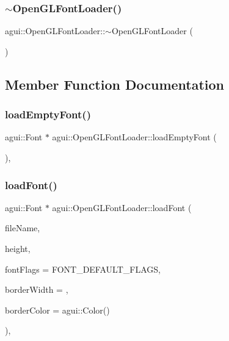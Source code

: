 \subsubsection{\texorpdfstring{$\sim$\+Open\+G\+L\+Font\+Loader()}{~OpenGLFontLoader()}}
{\footnotesize\ttfamily agui\+::\+Open\+G\+L\+Font\+Loader\+::$\sim$\+Open\+G\+L\+Font\+Loader (\begin{DoxyParamCaption}{ }\end{DoxyParamCaption})}



\subsection{Member Function Documentation}
\mbox{\label{classagui_1_1_open_g_l_font_loader_af11760c16e9f88ee6c534a914897096e}} 
\subsubsection{\texorpdfstring{load\+Empty\+Font()}{loadEmptyFont()}}
{\footnotesize\ttfamily agui\+::\+Font $\ast$ agui\+::\+Open\+G\+L\+Font\+Loader\+::load\+Empty\+Font (\begin{DoxyParamCaption}{ }\end{DoxyParamCaption})\hspace{0.3cm}{\ttfamily [override]}, {\ttfamily [virtual]}}

\mbox{\label{classagui_1_1_open_g_l_font_loader_a6f90ac8ad2a2d11c6423d5c9559e3f65}} 
\subsubsection{\texorpdfstring{load\+Font()}{loadFont()}}
{\footnotesize\ttfamily agui\+::\+Font $\ast$ agui\+::\+Open\+G\+L\+Font\+Loader\+::load\+Font (\begin{DoxyParamCaption}\item[{const std\+::string \&}]{file\+Name,  }\item[{int}]{height,  }\item[{Font\+Flags}]{font\+Flags = {\ttfamily FONT\+\_\+DEFAULT\+\_\+FLAGS},  }\item[{float}]{border\+Width = {},  }\item[{agui\+::\+Color}]{border\+Color = {\ttfamily agui\+:\+:Color()} }\end{DoxyParamCaption})\hspace{0.3cm}{\ttfamily [override]}, {\ttfamily [virtual]}}



